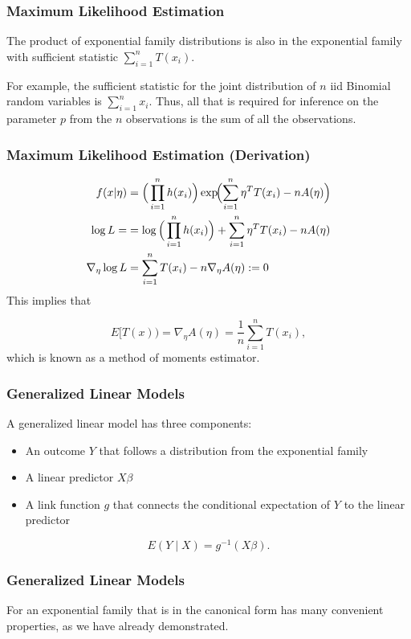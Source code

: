\documentclass{beamer}
\begin{document}
\begin{frame}
\frametitle{Maximum Likelihood Estimation}
The product of exponential family distributions is also in the exponential family with sufficient statistic $\sum_{i=1}^n T(x_i).$

\vspace*{1em}

For example, the sufficient statistic for the joint distribution of $n$ iid Binomial random variables is $\sum_{i=1}^n x_i.$ Thus, all that is required for inference on the parameter $p$ from the $n$ observations is the sum of all the observations. 
\end{frame}

\begin{frame}
\frametitle{Maximum Likelihood Estimation (Derivation)}
\begin{align}
f(x|\eta)  &= \Big(
\prod_{i=1}^n h(x_i)
\Big) \exp\!\Bigl(\sum_{i=1}^n \eta^T T(x_i) - nA(\eta)\Bigr) \\
\log L = &=  \log \Big(
\prod_{i=1}^n h(x_i)
\Big) 
+ \sum_{i=1}^n \eta^T T(x_i) - nA(\eta)\\
\nabla_{\eta} \log L &= \sum_{i=1}^n T(x_i) - n \nabla_{\eta} A(\eta) :=0
\end{align}
This implies that 

$$E[T(x)) =  \nabla_{\eta} A(\eta) = \frac{1}{n} \sum_{i=1}^n T(x_i),$$
which is known as a method of moments estimator. 

\end{frame}

\begin{frame}
\frametitle{Generalized Linear Models}

A generalized linear model has three components:

\begin{itemize}
\item An outcome $Y$ that follows a distribution from the
exponential family
\item A linear predictor $X \beta$
\item A link function $g$ that connects the conditional expectation of $Y$ to the linear predictor
\end{itemize}
$$E(Y \mid X) = g^{-1}(X \beta).$$

\end{frame}

\begin{frame}
\frametitle{Generalized Linear Models}

For an exponential family that is in the canonical form has many convenient properties, as we have already demonstrated. 

\end{frame}
\end{document}
